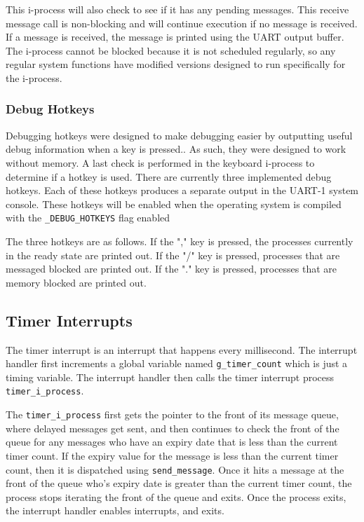 \documentclass[se]{uw-wkrpt}
\begin{document}
This i-process will also check to see if it has any pending messages. This receive message call is non-blocking and will continue execution if no message is received. If a message is received, the message is printed using the UART output buffer. The i-process cannot be blocked because it is not scheduled regularly, so any regular system functions have modified versions designed to run specifically for the i-process.

\subsubsection{Debug Hotkeys}

Debugging hotkeys were designed to make debugging easier by outputting useful debug information when a key is pressed.. As such, they were designed to work without memory. A last check is performed in the keyboard i-process to determine if a hotkey is used. There are currently three implemented debug hotkeys. Each of these hotkeys produces a separate output in the UART-1 system console. These hotkeys will be enabled when the operating system is compiled with the \texttt{\_DEBUG\_HOTKEYS} flag enabled

The three hotkeys are as follows. If the "," key is pressed, the processes currently in the ready state are printed out. If the "/" key is pressed, processes that are messaged blocked are printed out. If the "." key is pressed, processes that are memory blocked are printed out.

\subsection{Timer Interrupts}

The timer interrupt is an interrupt that happens every millisecond. The interrupt handler first increments a global variable named \texttt{g\_timer\_count} which is just a timing variable. The interrupt handler then calls the timer interrupt process \texttt{timer\_i\_process}. 

The \texttt{timer\_i\_process} first gets the pointer to the front of its message queue, where delayed messages get sent, and then continues to check the front of the queue for any messages who have an expiry date that is less than the current timer count. If the expiry value for the message is less than the current timer count, then it is dispatched using \texttt{send\_message}. Once it hits a message at the front of the queue who's expiry date is greater than the current timer count, the process stops iterating the front of the queue and exits. Once the process exits, the interrupt handler enables interrupts, and exits.
\end{document}
